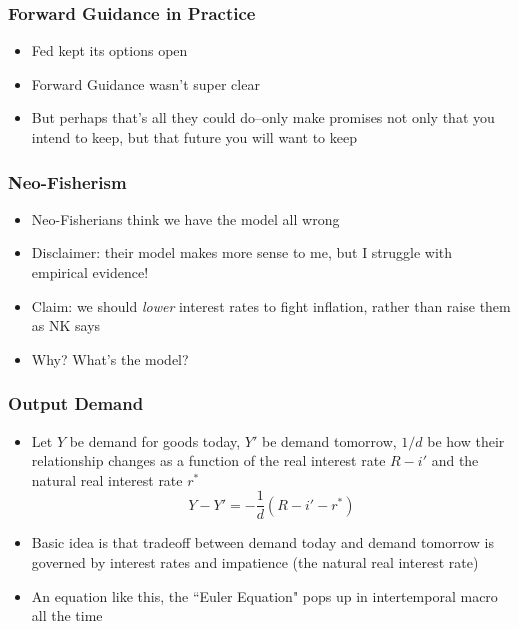 \documentclass{beamer}
\begin{document}
\begin{frame}
\frametitle[alignment=center]{Forward Guidance in Practice}
\footnotesize
\begin{itemize}
\item Fed kept its options open
\bigskip
\item Forward Guidance wasn't super clear
\bigskip
\item But perhaps that's all they could do--only make promises not only that you intend to keep, but that future you will want to keep
\end{itemize}
\end{frame}


\begin{frame}
\frametitle[alignment=center]{Neo-Fisherism}
\footnotesize
\begin{itemize}
\item Neo-Fisherians think we have the model all wrong
\bigskip
\item Disclaimer:  their model makes more sense to me, but I struggle with empirical evidence!
\bigskip
\item Claim: we should \emph{lower} interest rates to fight inflation, rather than raise them as NK says
\bigskip
\item Why? What's the model?
\end{itemize}
\end{frame}

\begin{frame}
\frametitle[alignment=center]{Output Demand}
\footnotesize
\begin{itemize}
\item Let $Y$ be demand for goods today, $Y'$ be demand tomorrow, $1/d$ be how their relationship changes as a function of the real interest rate $R-i'$ and the natural real interest rate $r^*$
\bigskip
$$Y-Y'=-\frac{1}{d}(R-i'-r^*)$$
\item Basic idea is that tradeoff between demand today and demand tomorrow is governed by interest rates and impatience (the natural real interest rate)
\bigskip
\item An equation like this, the ``Euler Equation" pops up in intertemporal macro all the time
\end{itemize}
\end{frame}
\end{document}
